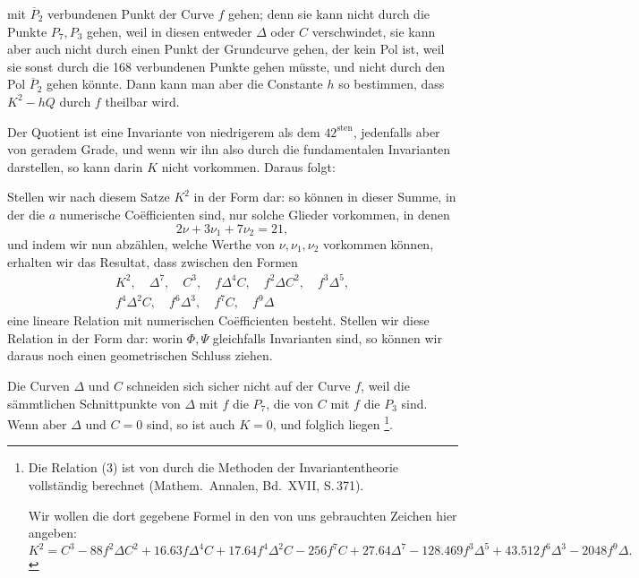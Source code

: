 mit $\overline{P}_2$ verbundenen Punkt der Curve $f$ gehen; denn sie
kann nicht durch die Punkte $P_7, P_3$ gehen, weil in diesen entweder
$\Delta$ oder $C$ verschwindet, sie kann aber auch nicht durch einen
Punkt der Grundcurve gehen, der kein Pol ist, weil sie sonst durch
die 168 verbundenen Punkte gehen müsste, und nicht durch den Pol
$\overline{P}_2$ gehen könnte. Dann kann man aber die Constante $h$
so bestimmen, dass $K^2 - hQ$ durch $f$ theilbar wird.

Der Quotient ist eine Invariante von niedrigerem als dem
$42^{\text{sten}}$, jedenfalls aber von geradem Grade, und wenn wir
ihn also durch die fundamentalen Invarianten darstellen, so kann
darin $K$ nicht vorkommen. Daraus folgt:

\begin{center}
\end{center}

Stellen wir nach diesem Satze $K^2$ in der Form dar:
so können in dieser Summe, in der die $a$ numerische
Co\"efficienten sind, nur solche Glieder vorkommen, in denen
\[
2\nu + 3\nu_1 + 7\nu_2 = 21,
\]
und indem wir nun abzählen, welche Werthe von $\nu, \nu_1, \nu_2$
vorkommen können, erhalten wir das Resultat, dass zwischen den
Formen
\[
\begin{gathered}
K^2,\quad \Delta^7,\quad C^3,\quad f\Delta^4 C,\quad f^2\Delta C^2,\quad f^3\Delta^5,\\
f^4\Delta^2 C,\quad f^6\Delta^3,\quad f^7 C,\quad f^9\Delta
\end{gathered}
\]
eine lineare Relation mit numerischen Co\"efficienten besteht.
Stellen wir diese Relation in der Form dar:
worin $\Phi, \Psi$ gleichfalls Invarianten sind, so können wir daraus
noch einen geometrischen Schluss ziehen.

Die Curven $\Delta$ und $C$ schneiden sich sicher nicht auf der Curve
$f$, weil die sämmtlichen Schnittpunkte von $\Delta$ mit $f$ die
$P_7$, die von $C$ mit $f$ die $P_3$ sind. Wenn aber $\Delta$ und
$C = 0$ sind, so ist auch $K = 0$, und folglich liegen
\footnote{Die Relation (3) ist von  durch die
Methoden der Invariantentheorie vollständig berechnet (Mathem.\
Annalen, Bd.\ XVII, S.\,371).

Wir wollen die dort gegebene Formel in
den von uns gebrauchten Zeichen hier angeben:
\[
K^2 = C^3 - 88f^2\Delta C^2 + 16.63f\Delta^4 C + 17.64f^4\Delta^2 C
- 256f^7 C + 27.64\Delta^7 - 128.469f^3\Delta^5 + 43.512f^6\Delta^3
- 2048f^9\Delta.
\]}.
